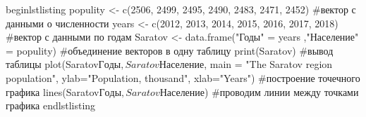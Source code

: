 \usepackage{listings}

begin{lstlisting}
populity <- c(2506, 2499, 2495, 2490, 2483, 2471, 2452) #вектор с данными о численности
years <- c(2012, 2013, 2014, 2015, 2016, 2017, 2018) #вектор с данными по годам
Saratov <- data.frame("Годы" = years ,"Население" = populity) #объединение векторов в одну таблицу
print(Saratov) #вывод таблицы
plot(Saratov$Годы, Saratov$Население, main = "The Saratov region population", ylab="Population, thousand", xlab="Years") #построение точечного графика 
lines(Saratov$Годы, Saratov$Население) #проводим линии между точками графика
end{lstlisting}